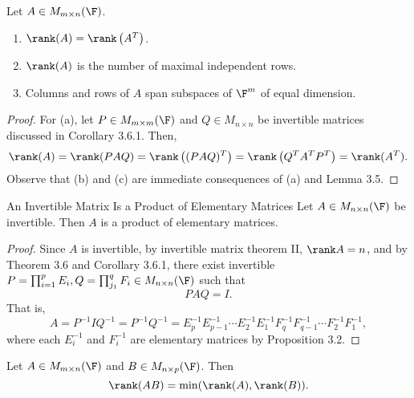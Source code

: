 \documentclass[linearalgebraI]{subfiles}
\begin{document}
    \begin{cor}{}
        Let $A\in M_{m\times n}(\F)$. 
        \begin{enumerate}
            \item $\rank(A) = \rank\left( A^{T}  \right) $.
            \item $\rank(A)$ is the number of maximal independent rows.
            \item Columns and rows of $A$ span subspaces of $\F^m$ of equal dimension.
        \end{enumerate}
    \end{cor}	

    \begin{proof}
        For (a), let $P\in M_{m\times m}(\F)$ and $Q\in M_{n\times n}$ be invertible matrices discussed in Corollary 3.6.1. Then,
        \begin{equation*}
            \rank(A) = \rank(PAQ) = \rank \left( (PAQ)^T \right) = \rank \left( Q^TA^TP^T \right) = \rank (A^T). 
        \end{equation*}
        Observe that (b) and (c) are immediate consequences of (a) and Lemma 3.5.
    \end{proof}

    \begin{cor}{An Invertible Matrix Is a Product of Elementary Matrices}
        Let $A\in M_{n\times n}(\F)$ be invertible. Then $A$ is a product of elementary matrices.
    \end{cor}	

    \begin{proof}
        Since $A$ is invertible, by invertible matrix theorem II, $\rank A = n$, and by Theorem 3.6 and Corollary 3.6.1, there exist invertible $P=\prod^p_{i=1}E_i, Q=\prod^q_{j_1}F_i\in M_{n\times n}(\F)$ such that
        \begin{equation*}
            PAQ = I.
        \end{equation*}
        That is,
        \begin{equation*}
            A = P^{-1}IQ^{-1} = P^{-1}Q^{-1} = E_p^{-1}E_{p-1}^{-1}\cdots E_2^{-1}E_1^{-1} F_q^{-1}F_{q-1}^{-1}\cdots F_2^{-1}F_1^{-1},
        \end{equation*}
        where each $E_i^{-1}$ and $F_i^{-1}$ are elementary matrices by Proposition 3.2.
    \end{proof}

    \begin{prop}{}
        Let $A\in M_{m\times n}(\F)$ and $B\in M_{n\times p}(\F)$. Then
        \begin{equation*}
            \rank(AB) = \min(\rank(A), \rank(B)).
        \end{equation*}
    \end{prop}
\end{document}

